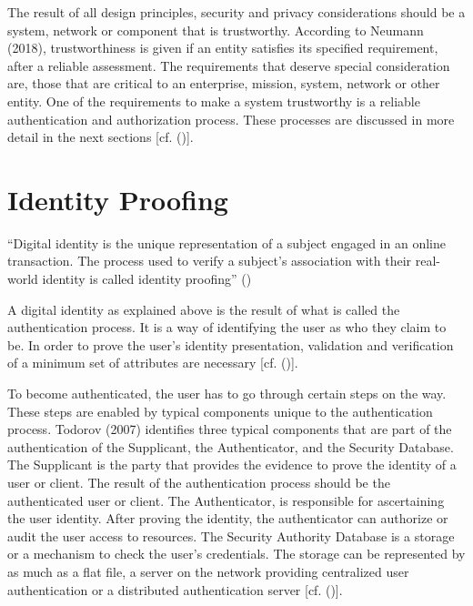 The result of all design principles, security and privacy considerations should be a system, network or component that is trustworthy. According to Neumann (2018), trustworthiness is given if an entity satisfies its specified requirement, after a reliable assessment. The requirements that deserve special consideration are, those that are critical to an enterprise, mission, system, network or other entity. One of the requirements to make a system trustworthy is a reliable authentication and authorization process. These processes are discussed in more detail in the next sections [cf. (\cite{Neumann:2018:PTC})].



\section{Identity Proofing}
\label{identityProofing}

“Digital identity is the unique representation of a subject engaged in an online transaction. The process used to verify a subject’s association with their real-world identity is called identity proofing” (\cite{NIST:2017:DIG})

A digital identity as explained above is the result of what is called the authentication process. It is a way of identifying the user as who they claim to be. In order to prove the user's identity presentation, validation and verification of a minimum set of attributes are necessary [cf. (\cite{Boyd:2012:GSOAuth})]. 

To become authenticated, the user has to go through certain steps on the way. These steps are enabled by typical components unique to the authentication process. Todorov (2007) identifies three typical components that are part of the authentication of the Supplicant, the Authenticator, and the Security Database. The Supplicant is the party that provides the evidence to prove the identity of a user or client. The result of the authentication process should be the authenticated user or client. The Authenticator, is responsible for ascertaining the user identity. After proving the identity, the authenticator can authorize or audit the user access to resources. The Security Authority Database is a storage or a mechanism to check the user's credentials. The storage can be represented by as much as a flat file, a server on the network providing centralized user authentication or a distributed authentication server [cf. (\cite{Todorov:2007:MUI})]. 



